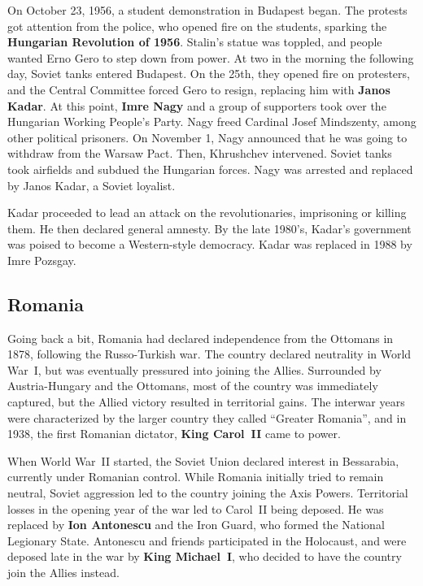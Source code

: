 On October 23, 1956, a student demonstration in Budapest began.
The protests got attention from the police, who opened fire on the students,
sparking the \textbf{Hungarian Revolution of 1956}.
Stalin's statue was toppled, and people wanted Erno Gero to step down from power.
At two in the morning the following day, Soviet tanks entered Budapest.
On the 25th, they opened fire on protesters,
and the Central Committee forced Gero to resign, replacing him with \textbf{Janos Kadar}.
At this point,
\textbf{Imre Nagy} and a group of supporters took over the Hungarian Working People's Party.
Nagy freed Cardinal Josef Mindszenty, among other political prisoners.
On November 1, Nagy announced that he was going to withdraw from the Warsaw Pact.
Then, Khrushchev intervened.
Soviet tanks took airfields and subdued the Hungarian forces.
Nagy was arrested and replaced by Janos Kadar, a Soviet loyalist.

Kadar proceeded to lead an attack on the revolutionaries, imprisoning or killing them.
He then declared general amnesty.
By the late 1980's, Kadar's government was poised to become a Western-style democracy.
Kadar was replaced in 1988 by Imre Pozsgay.

\subsection*{Romania}

Going back a bit, Romania had declared independence from the Ottomans in 1878,
following the Russo-Turkish war.
The country declared neutrality in World War~I,
but was eventually pressured into joining the Allies.
Surrounded by Austria-Hungary and the Ottomans, most of the country was immediately captured,
but the Allied victory resulted in territorial gains.
The interwar years were characterized by the larger country they called ``Greater Romania'',
and in 1938, the first Romanian dictator, \textbf{King Carol~II} came to power.

When World War~II started,
the Soviet Union declared interest in Bessarabia, currently under Romanian control.
While Romania initially tried to remain neutral,
Soviet aggression led to the country joining the Axis Powers.
Territorial losses in the opening year of the war led to Carol~II being deposed.
He was replaced by \textbf{Ion Antonescu} and the Iron Guard,
who formed the National Legionary State.
Antonescu and friends participated in the Holocaust,
and were deposed late in the war by \textbf{King Michael~I},
who decided to have the country join the Allies instead.

